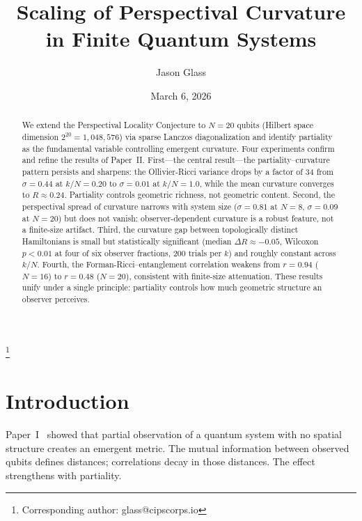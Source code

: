 \documentclass[aps,pra,twocolumn,superscriptaddress,floatfix]{revtex4-2}
\begin{document}
\title{Scaling of Perspectival Curvature in Finite Quantum Systems}

\author{Jason Glass}
\thanks{Corresponding author: glass@cipscorps.io}

\date{March 6, 2026}

\begin{abstract}
We extend the Perspectival Locality Conjecture to $N = 20$ qubits (Hilbert space dimension $2^{20} = 1{,}048{,}576$) via sparse Lanczos diagonalization and identify partiality as the fundamental variable controlling emergent curvature.  Four experiments confirm and refine the results of Paper~II\@.  First---the central result---the partiality--curvature pattern persists and sharpens: the Ollivier-Ricci variance drops by a factor of 34 from $\sigma = 0.44$ at $k/N = 0.20$ to $\sigma = 0.01$ at $k/N = 1.0$, while the mean curvature converges to $R \approx 0.24$.  Partiality controls geometric richness, not geometric content.  Second, the perspectival spread of curvature narrows with system size ($\sigma = 0.81$ at $N = 8$, $\sigma = 0.09$ at $N = 20$) but does not vanish: observer-dependent curvature is a robust feature, not a finite-size artifact.  Third, the curvature gap between topologically distinct Hamiltonians is small but statistically significant (median $\Delta R \approx -0.05$, Wilcoxon $p < 0.01$ at four of six observer fractions, 200 trials per $k$) and roughly constant across $k/N$.  Fourth, the Forman-Ricci--entanglement correlation weakens from $r = 0.94$ ($N = 16$) to $r = 0.48$ ($N = 20$), consistent with finite-size attenuation.  These results unify under a single principle: partiality controls how much geometric structure an observer perceives.
\end{abstract}

\maketitle

\section{Introduction}

Paper~I~\cite{glass2026plc1} showed that partial observation of a quantum system with no spatial structure creates an emergent metric.  The mutual information between observed qubits defines distances; correlations decay in those distances.  The effect strengthens with partiality.
\end{document}

